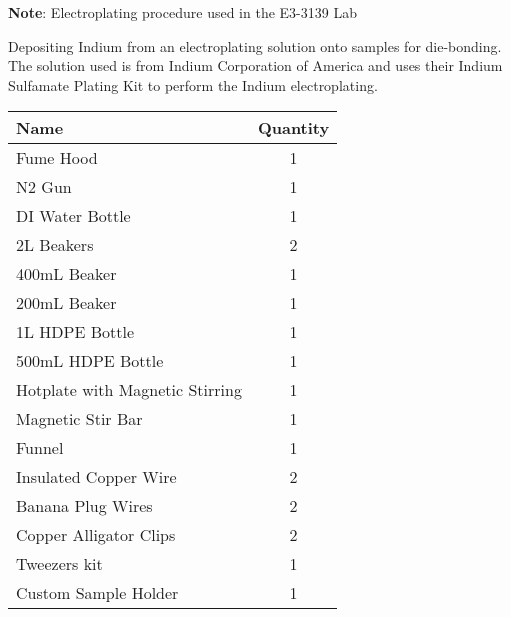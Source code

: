
\begin{center} %
    \begin{framed} %
        \begin{minipage}{0.8\textwidth} %
            \raggedright %
            \textbf{Note}: Electroplating procedure used in the E3-3139 Lab

            \vspace{0.1cm} %

            Depositing Indium from an electroplating solution onto samples for die-bonding. The solution used is from Indium Corporation of America and uses their Indium Sulfamate Plating Kit to perform the Indium electroplating.

            \begin{center}

            \begin{tabular}{|l|c|}
                \hline
                \textbf{Name}  &   \textbf{Quantity} \\
                \hline
                Fume Hood                           &	1 \\
                N2 Gun                              &	1 \\
                DI Water Bottle                     &	1 \\
                2L Beakers                          &	2 \\
                400mL Beaker                        &	1 \\
                200mL Beaker                        &	1 \\
                1L HDPE Bottle                      &	1 \\
                500mL HDPE Bottle                   &	1 \\
                Hotplate with Magnetic Stirring     &	1 \\
                Magnetic Stir Bar                   &   1 \\
                Funnel                              &	1 \\
                Insulated Copper Wire               &	2 \\
                Banana Plug Wires                   &	2 \\
                Copper Alligator Clips              &	2 \\
                Tweezers kit                        &	1 \\
                Custom Sample Holder                &	1 \\
                \hline
            \end{tabular}


\end{center}
\end{minipage}
\end{framed}
\end{center}
